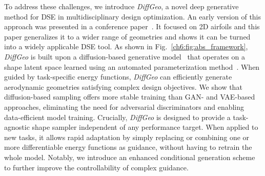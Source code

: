 To address these challenges, we introduce \textit{DiffGeo}, a novel deep generative method for DSE in multidisciplinary design optimization. An early version of this approach was presented in a conference paper~\cite{aa.Wei2024}. It focused on 2D airfoils and this paper generalizes it to a wider range of geometries and shows it can be turned into a widely applicable DSE tool. As shown in Fig.~\ref{ch6:fig:abs_framework}, \textit{DiffGeo} is built upon a diffusion-based generative model~\cite{ai.SohlDickstein2015} that operates on a shape latent space learned using an automated parameterization method~\cite{aa.Wei2023,aa.Wei2023b}. When guided by task-specific energy functions, \textit{DiffGeo} can efficiently generate aerodynamic geometries satisfying complex design objectives.  We show that diffusion-based sampling offers more stable training than  GAN- and VAE-based approaches,  eliminating the need for adversarial discriminators and enabling data-efficient model training. Crucially, \textit{DiffGeo} is designed to provide a task-agnostic shape sampler independent of any performance target. When applied to new tasks, it allows rapid adaptation by simply replacing or combining one or more differentiable energy functions as guidance, without having to retrain the whole model. Notably, we introduce an enhanced conditional generation scheme to further improve the controllability of complex guidance.

